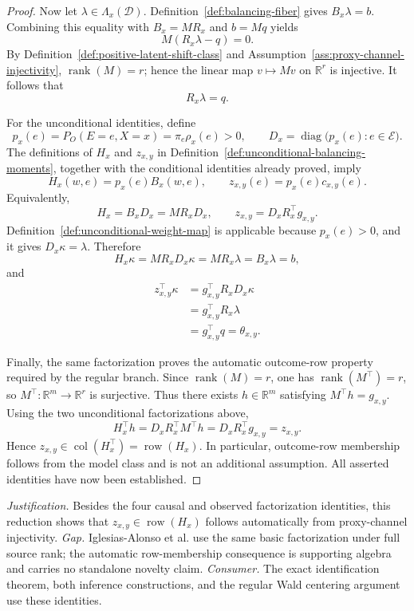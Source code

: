 \documentclass{article}
\begin{document}
\begin{proof}
Now let \(\lambda\in\Lambda_x(\mathcal D)\).  Definition~\ref{def:balancing-fiber} gives \(B_x\lambda=b\).  Combining this equality with \(B_x=MR_x\) and \(b=Mq\) yields
\[
M(R_x\lambda-q)=0.
\]
By Definition~\ref{def:positive-latent-shift-class} and Assumption~\ref{ass:proxy-channel-injectivity}, \(\operatorname{rank}(M)=r\); hence the linear map \(v\mapsto Mv\) on \(\mathbb R^r\) is injective.  It follows that
\[
R_x\lambda=q.
\]

For the unconditional identities, define
\[
p_x(e)=P_O(E=e,X=x)=\pi_e\rho_x(e)>0,
\qquad
D_x=\operatorname{diag}\bigl(p_x(e):e\in\mathcal E\bigr).
\]
The definitions of \(H_x\) and \(z_{x,y}\) in Definition~\ref{def:unconditional-balancing-moments}, together with the conditional identities already proved, imply
\[
H_x(w,e)=p_x(e)B_x(w,e),
\qquad
z_{x,y}(e)=p_x(e)c_{x,y}(e).
\]
Equivalently,
\[
H_x=B_xD_x=MR_xD_x,
\qquad
z_{x,y}=D_xR_x^{\top}g_{x,y}.
\]
Definition~\ref{def:unconditional-weight-map} is applicable because \(p_x(e)>0\), and it gives \(D_x\kappa=\lambda\).  Therefore
\[
H_x\kappa
=MR_xD_x\kappa
=MR_x\lambda
=B_x\lambda
=b,
\]
and
\[
\begin{aligned}
z_{x,y}^{\top}\kappa
&=g_{x,y}^{\top}R_xD_x\kappa\\
&=g_{x,y}^{\top}R_x\lambda\\
&=g_{x,y}^{\top}q
=\theta_{x,y}.
\end{aligned}
\]

Finally, the same factorization proves the automatic outcome-row property required by the regular branch.  Since \(\operatorname{rank}(M)=r\), one has \(\operatorname{rank}(M^{\top})=r\), so \(M^{\top}:\mathbb R^m\to\mathbb R^r\) is surjective.  Thus there exists \(h\in\mathbb R^m\) satisfying \(M^{\top}h=g_{x,y}\).  Using the two unconditional factorizations above,
\[
H_x^{\top}h
=D_xR_x^{\top}M^{\top}h
=D_xR_x^{\top}g_{x,y}
=z_{x,y}.
\]
Hence \(z_{x,y}\in\operatorname{col}(H_x^{\top})=\operatorname{row}(H_x)\).  In particular, outcome-row membership follows from the model class and is not an additional assumption.  All asserted identities have now been established.
\end{proof}
\par\smallskip\noindent \textit{Justification.} Besides the four causal and observed factorization identities, this reduction shows that \(z_{x,y}\in\operatorname{row}(H_x)\) follows automatically from proxy-channel injectivity. \textit{Gap.} Iglesias-Alonso et al. use the same basic factorization under full source rank; the automatic row-membership consequence is supporting algebra and carries no standalone novelty claim. \textit{Consumer.} The exact identification theorem, both inference constructions, and the regular Wald centering argument use these identities.
\end{document}
